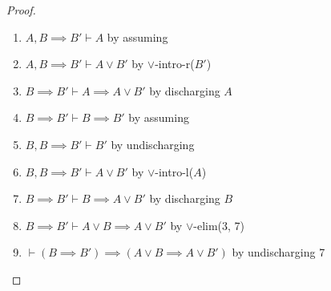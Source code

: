 \begin{proof}
\begin{enumerate}
\item $A,B\implies B'\vdash A$ by assuming%
\item $A,B\implies B'\vdash A\lor B'$ by $\lor$-intro-r($B'$)%
\item $B\implies B'\vdash A\implies A\lor B'$ by discharging $A$%
\item $B\implies B'\vdash B\implies B'$ by assuming %
\item $B,B\implies B'\vdash B'$ by undischarging%
\item $B,B\implies B'\vdash A\lor B'$ by $\lor$-intro-l($A$)%
\item $B\implies B'\vdash B\implies A\lor B'$ by discharging $B$%
\item $B\implies B'\vdash A\lor B\implies A\lor B'$ by $\lor$-elim(3, 7)%
\item $\vdash(B\implies B')\implies(A\lor B\implies A\lor B')$
  by undischarging 7\qedhere
\end{enumerate}
\end{proof}


